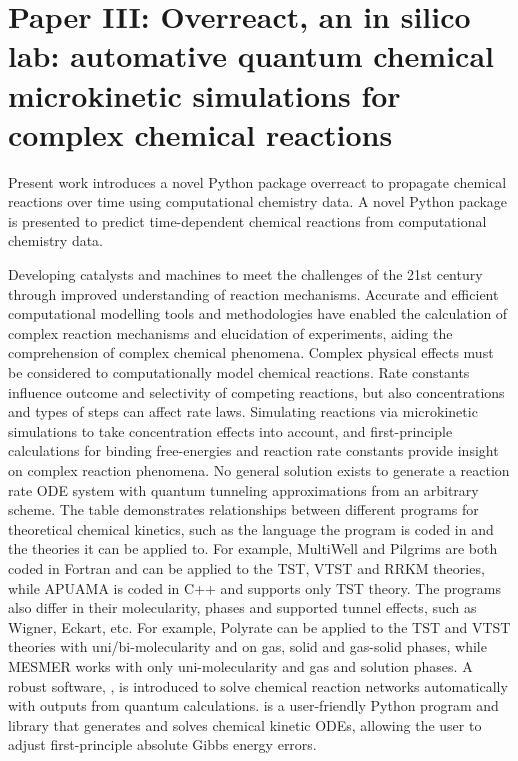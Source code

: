 \chapter{Paper III:\@
  Overreact, an in silico lab:
  \linebreak automative quantum chemical microkinetic simulations
  for complex chemical reactions
 }%
\label{ch:paper3}


Present work introduces a novel Python package overreact to propagate chemical reactions over time using computational chemistry data.
A novel Python package is presented to predict time-dependent chemical reactions from computational chemistry data.

Developing catalysts and machines to meet the challenges of the 21st century through improved understanding of reaction mechanisms.
Accurate and efficient computational modelling tools and methodologies have enabled the calculation of complex reaction mechanisms and elucidation of experiments, aiding the comprehension of complex chemical phenomena.
Complex physical effects must be considered to computationally model chemical reactions.
Rate constants influence outcome and selectivity of competing reactions, but also concentrations and types of steps can affect rate laws.
Simulating reactions via microkinetic simulations to take concentration effects into account, and first-principle calculations for binding free-energies and reaction rate constants provide insight on complex reaction phenomena.
No general solution exists to generate a reaction rate ODE system with quantum tunneling approximations from an arbitrary scheme.
The table demonstrates relationships between different programs for theoretical chemical kinetics, such as the language the program is coded in and the theories it can be applied to. For example, MultiWell and Pilgrims are both coded in Fortran and can be applied to the TST, VTST and RRKM theories, while APUAMA is coded in C++ and supports only TST theory. The programs also differ in their molecularity, phases and supported tunnel effects, such as Wigner, Eckart, etc. For example, Polyrate can be applied to the TST and VTST theories with uni/bi-molecularity and on gas, solid and gas-solid phases, while MESMER works with only uni-molecularity and gas and solution phases.
%
A robust software, \overreact, is introduced to solve chemical reaction networks automatically with outputs from quantum calculations.
\overreact is a user-friendly Python program and library that generates and solves chemical kinetic ODEs, allowing the user to adjust first-principle absolute Gibbs energy errors.


